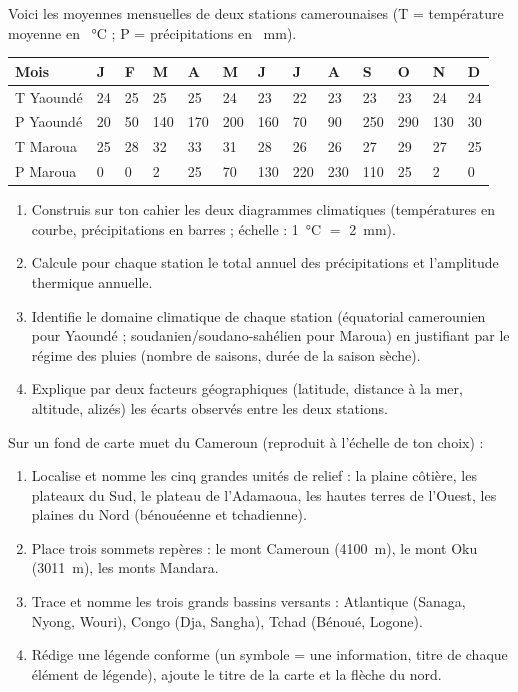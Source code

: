 \documentclass[11pt]{article}
\begin{document}
\begin{exercice}
Voici les moyennes mensuelles de deux stations camerounaises (T = température moyenne en \SI{}{\celsius} ; P = précipitations en \SI{}{mm}).

\begin{center}
\begin{tabularx}{\linewidth}{|l|X|X|X|X|X|X|X|X|X|X|X|X|}
\hline
\rowcolor{popblueL} \textbf{Mois} & J & F & M & A & M & J & J & A & S & O & N & D \\
\hline
T Yaoundé & 24 & 25 & 25 & 25 & 24 & 23 & 22 & 23 & 23 & 23 & 24 & 24 \\
\hline
P Yaoundé & 20 & 50 & 140 & 170 & 200 & 160 & 70 & 90 & 250 & 290 & 130 & 30 \\
\hline
T Maroua & 25 & 28 & 32 & 33 & 31 & 28 & 26 & 26 & 27 & 29 & 27 & 25 \\
\hline
P Maroua & 0 & 0 & 2 & 25 & 70 & 130 & 220 & 230 & 110 & 25 & 2 & 0 \\
\hline
\end{tabularx}
\end{center}

\begin{enumerate}
\item Construis sur ton cahier les deux diagrammes climatiques (températures en courbe, précipitations en barres ; échelle : \SI{1}{\celsius} $=$ \SI{2}{mm}).
\item Calcule pour chaque station le total annuel des précipitations et l'amplitude thermique annuelle.
\item Identifie le domaine climatique de chaque station (équatorial camerounien pour Yaoundé ; soudanien/soudano-sahélien pour Maroua) en justifiant par le régime des pluies (nombre de saisons, durée de la saison sèche).
\item Explique par deux facteurs géographiques (latitude, distance à la mer, altitude, alizés) les écarts observés entre les deux stations.
\end{enumerate}
\end{exercice}

\begin{exercice}
Sur un fond de carte muet du Cameroun (reproduit à l'échelle de ton choix) :
\begin{enumerate}
\item Localise et nomme les cinq grandes unités de relief : la plaine côtière, les plateaux du Sud, le plateau de l'Adamaoua, les hautes terres de l'Ouest, les plaines du Nord (bénouéenne et tchadienne).
\item Place trois sommets repères : le mont Cameroun (\SI{4100}{m}), le mont Oku (\SI{3011}{m}), les monts Mandara.
\item Trace et nomme les trois grands bassins versants : Atlantique (Sanaga, Nyong, Wouri), Congo (Dja, Sangha), Tchad (Bénoué, Logone).
\item Rédige une légende conforme (un symbole = une information, titre de chaque élément de légende), ajoute le titre de la carte et la flèche du nord.
\end{enumerate}
\end{exercice}
\end{document}
